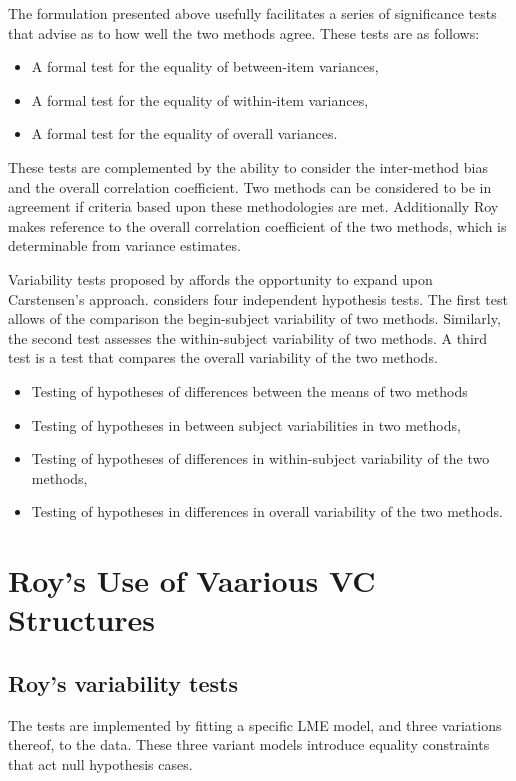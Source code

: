 \documentclass[12pt, a4paper]{report}
\theoremstyle{plain}
\theoremstyle{definition}
\theoremstyle{remark}
\begin{document}
The formulation presented above usefully facilitates a series of significance tests that advise as to how well the two methods agree. These tests are as follows:
	\begin{itemize}
		\item A formal test for the equality of between-item variances,
		\item A formal test for the equality of within-item variances,
		\item A formal test for the equality of overall variances.
	\end{itemize}
These tests are complemented by the ability to consider the inter-method bias and the overall correlation coefficient. Two methods can be considered to be in agreement if criteria based upon these methodologies are met. Additionally Roy makes reference to the overall correlation coefficient of the two methods, which is determinable from variance estimates.

	
	Variability tests proposed by \citet{ARoy2009} affords the opportunity to expand upon Carstensen's approach. \citet{ARoy2009} considers four independent hypothesis tests. The first test allows of the comparison the begin-subject variability of two methods. Similarly, the second test assesses the within-subject variability of two methods. A third test is a test that compares the overall variability of the two methods.
	\begin{itemize}
		\item Testing of hypotheses of differences between the means of
		two methods\item Testing of hypotheses in between subject
		variabilities in two methods, \item Testing of hypotheses of
		differences in within-subject variability of the two methods,
		\item Testing of hypotheses in differences in overall variability
		of the two methods.
	\end{itemize}
		

	

	\section{Roy's Use of Vaarious VC Structures}
	\subsection{Roy's variability tests}
	
	
	The tests are implemented by fitting a specific LME model, and three variations thereof, to the data. These three variant models introduce equality constraints that act null hypothesis cases.
	
\end{document}
